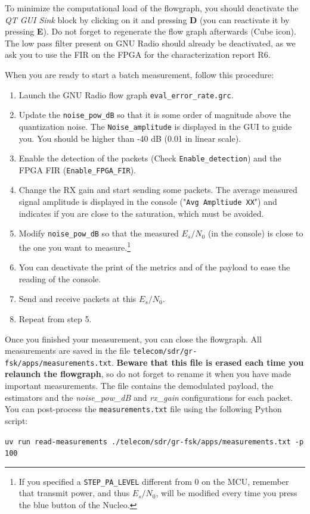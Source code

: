 To minimize the computational load of the flowgraph, you should deactivate the \textit{QT GUI Sink} block by clicking on it and pressing \textbf{D} (you can reactivate it by pressing \textbf{E}). Do not forget to regenerate the flow graph afterwards (Cube icon). The low pass filter present on GNU Radio should already be deactivated, as we ask you to use the FIR on the FPGA for the characterization report R6.

When you are ready to start a batch measurement, follow this procedure:
\begin{enumerate}
    \item Launch the GNU Radio flow graph \texttt{eval\_error\_rate.grc}.
    \item Update the \texttt{noise\_pow\_dB} so that it is some order of magnitude above the quantization noise. The \texttt{Noise\_amplitude} is displayed in the GUI to guide you. You should be higher than -40 dB (0.01 in linear scale).
    \item Enable the detection of the packets (Check \texttt{Enable\_detection}) and the FPGA FIR (\texttt{Enable\_FPGA\_FIR}).
    \item Change the RX gain and start sending some packets. The average measured signal amplitude is displayed in the console ("\texttt{Avg Ampltiude XX}") and indicates if you are close to the saturation, which must be avoided.
    \item Modify \texttt{noise\_pow\_dB} so that the measured $E_s/N_0$ (in the console) is close to the one you want to measure.\footnote[2]{If you specified a \texttt{STEP\_PA\_LEVEL} different from 0 on the MCU, remember that transmit power, and thus $E_s/N_0$, will be modified every time you press the blue button of the Nucleo.}
    \item You can deactivate the print of the metrics and of the payload to ease the reading of the console.
    \item Send and receive packets at this $E_s/N_0$.
    \item Repeat from step 5.
\end{enumerate}

Once you finished your measurement, you can close the flowgraph. All measurements are saved in the file \texttt{telecom/sdr/gr-fsk/apps/measurements.txt}. \textbf{Beware that this file is erased each time you relaunch the flowgraph}, so do not forget to rename it when you have made important measurements. The file contains the demodulated payload,  the estimators and the \textit{noise\_pow\_dB} and \textit{rx\_gain} configurations for each packet. You can post-process the \texttt{measurements.txt} file using the following Python script:
    \begin{center}
    \texttt{uv run read-measurements ./telecom/sdr/gr-fsk/apps/measurements.txt -p 100}\\
    \end{center}

